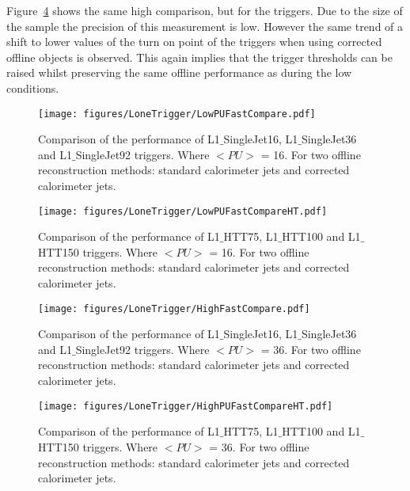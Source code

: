 Figure~\ref{fig:figures_LoneTrigger_HighPUFastCompareHT} shows the same high 
\pu comparison, but for the \Lone \HT triggers. Due to the size of the 
sample the precision of this measurement is low. However the same trend of a 
shift to lower \HT values of the turn on point of the \Lone triggers when using 
\pu corrected offline objects is observed. This again implies that the 
\Lone \HT trigger thresholds can be raised whilst preserving the same offline 
performance as during the low \pu conditions.

\begin{figure}[htbp]
  \centering
    \texttt{[image: figures/LoneTrigger/LowPUFastCompare.pdf]}
  \caption{Comparison of the performance of  L1$\_$SingleJet16, L1$\_$SingleJet36 and  L1$\_$SingleJet92 triggers. Where $<PU>$ = 16. For two offline reconstruction methods: standard \AK calorimeter jets and \pu corrected \AK calorimeter jets.}
  \label{fig:figures_LoneTrigger_LowPUFastCompare}
\end{figure}


\begin{figure}[htbp]
  \centering
    \texttt{[image: figures/LoneTrigger/LowPUFastCompareHT.pdf]}
  \caption{Comparison of the performance of L1$\_$HTT75, L1$\_$HTT100 and  L1$\_$HTT150 triggers. Where $<PU>$ = 16. For two offline reconstruction methods: standard \AK calorimeter jets and \pu corrected \AK calorimeter jets.}
  \label{fig:figures_LoneTrigger_LowPUFastCompareHT}
\end{figure}


\begin{figure}[htbp]
  \centering
    \texttt{[image: figures/LoneTrigger/HighFastCompare.pdf]}
  \caption{Comparison of the performance of L1$\_$SingleJet16, L1$\_$SingleJet36 and L1$\_$SingleJet92 triggers. Where $<PU>$ = 36. For two offline reconstruction methods: standard \AK calorimeter jets and \pu corrected \AK calorimeter jets.}
  \label{fig:figures_LoneTrigger_HighFastCompare}
\end{figure}

\begin{figure}[htbp]
  \centering
    \texttt{[image: figures/LoneTrigger/HighPUFastCompareHT.pdf]}
  \caption{Comparison of the performance of  L1$\_$HTT75, L1$\_$HTT100 and  L1$\_$HTT150 triggers. Where $<PU>$ = 36. For two offline reconstruction methods: standard \AK calorimeter jets and \pu corrected \AK calorimeter jets.}
  \label{fig:figures_LoneTrigger_HighPUFastCompareHT}
\end{figure}


